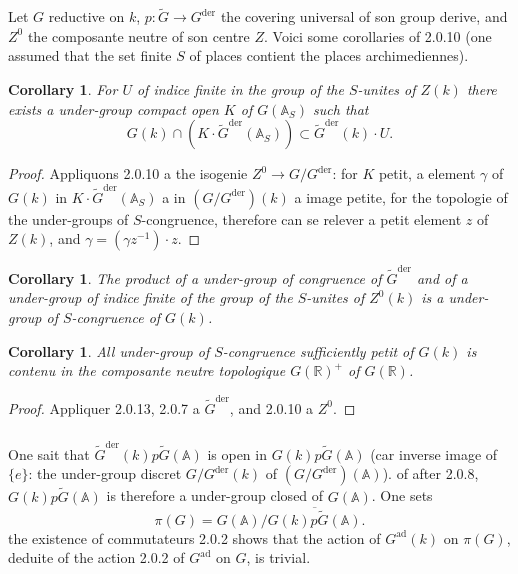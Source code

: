 \documentclass[12pt,a4paper]{article}
\theoremstyle{plain}
\newtheorem{corollary}[theorem]{Corollary}
\theoremstyle{definition}
\theoremstyle{remark}
\newcommand{\RR}{\mathbb{R}}
\newcommand{\A}{\mathbb{A}}
\begin{document}
Let $G$ reductive on $k$, $p:\tilde{G} \to G^{\text{der}}$ the covering universal of son group derive, and $Z^0$ the composante neutre of son centre $Z$. Voici some corollaries of 2.0.10 (one assumed that the set finite $S$ of places contient the places archimediennes).

\begin{corollary}
For $U$ of indice finite in the group of the $S$-unites of $Z(k)$ there exists a under-group compact open $K$ of $G(\A_S)$ such that
\[
G(k) \cap (K \cdot \tilde{G}^{\text{der}}(\A_S)) \subset \tilde{G}^{\text{der}}(k) \cdot U.
\]
\end{corollary}

\begin{proof}
Appliquons 2.0.10 a the isogenie $Z^0 \to G/G^{\text{der}}$: for $K$ petit, a element $\gamma$ of $G(k)$ in $K \cdot \tilde{G}^{\text{der}}(\A_S)$ a in $(G/G^{\text{der}})(k)$ a image petite, for the topologie of the under-groups of $S$-congruence, therefore can se relever a petit element $z$ of $Z(k)$, and $\gamma = (\gamma z^{-1}) \cdot z$.
\end{proof}

\begin{corollary}
The product of a under-group of congruence of $\tilde{G}^{\text{der}}$ and of a under-group of indice finite of the group of the $S$-unites of $Z^0(k)$ is a under-group of $S$-congruence of $G(k)$.
\end{corollary}

\begin{corollary}
All under-group of $S$-congruence sufficiently petit of $G(k)$ is contenu in the composante neutre topologique $G(\RR)^+$ of $G(\RR)$.
\end{corollary}

\begin{proof}
Appliquer 2.0.13, 2.0.7 a $\tilde{G}^{\text{der}}$, and 2.0.10 a $Z^0$.
\end{proof}

\subsubsection{}

One sait that $\tilde{G}^{\text{der}}(k)p\tilde{G}(\A)$ is open in $G(k)p\tilde{G}(\A)$ (car inverse image of $\{e\}$: the under-group discret $G/G^{\text{der}}(k)$ of $(G/G^{\text{der}})(\A)$). of after 2.0.8, $G(k)p\tilde{G}(\A)$ is therefore a under-group closed of $G(\A)$. One sets
\begin{equation}\label{eq:2.0.15.1}
\pi(G) = G(\A)/\overline{G(k)p\tilde{G}(\A)}.
\end{equation}
the existence of commutateurs 2.0.2 shows that the action of $G^{\text{ad}}(k)$ on $\pi(G)$, deduite of the action 2.0.2 of $G^{\text{ad}}$ on $G$, is trivial.
\end{document}
